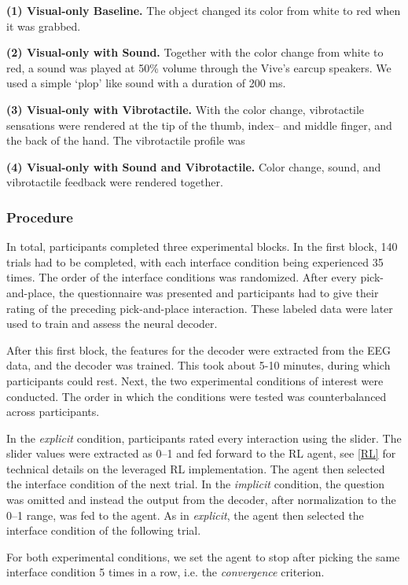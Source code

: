 \textbf{(1) Visual-only Baseline.} The object changed its color from white to red when it was grabbed.

\textbf{(2) Visual-only with Sound.} Together with the color change from white to red, a sound was played at 50\% volume through the Vive's earcup speakers. We used a simple `plop' like sound with a duration of 200 ms.

\textbf{(3) Visual-only with Vibrotactile.} With the color change, vibrotactile sensations were rendered at the tip of the thumb, index-- and middle finger, and the back of the hand. The vibrotactile profile was 

\textbf{(4) Visual-only with Sound and Vibrotactile.} Color change, sound, and vibrotactile feedback were rendered together.

\subsubsection{Procedure}
In total, participants completed three experimental blocks. In the first block, 140 trials had to be completed, with each interface condition being experienced 35 times. The order of the interface conditions was randomized. After every pick-and-place, the questionnaire was presented and participants had to give their rating of the preceding pick-and-place interaction. These labeled data were later used to train and assess the neural decoder.

After this first block, the features for the decoder were extracted from the EEG data, and the decoder was trained. This took about 5-10 minutes, during which participants could rest. Next, the two experimental conditions of interest were conducted. The order in which the conditions were tested was counterbalanced across participants. 

In the \textit{explicit} condition, participants rated every interaction using the slider. The slider values were extracted as 0--1 and fed forward to the RL agent, see \ref{RL} for technical details on the leveraged RL implementation. The agent then selected the interface condition of the next trial. In the \textit{implicit} condition, the question was omitted and instead the output from the decoder, after normalization to the 0--1 range, was fed to the agent. As in \textit{explicit}, the agent then selected the interface condition of the following trial. 

For both experimental conditions, we set the agent to stop after picking the same interface condition 5 times in a row, i.e. the \textit{convergence} criterion.


